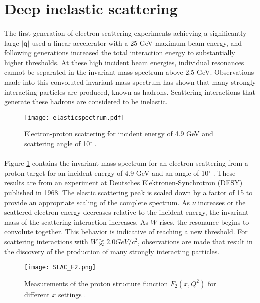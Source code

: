  
\section{Deep inelastic scattering}\label{sec:DIS}
\paragraph{}The first generation of electron scattering experiments achieving a significantly large  $|\boldsymbol{q}|$ used a linear accelerator with a 25 GeV maximum beam energy, and following generations increased the total interaction energy to substantially higher thresholds. At these high incident beam energies, individual resonances cannot be separated in the invariant mass spectrum above 2.5 GeV. Observations made into this convoluted invariant mass spectrum has shown that many strongly interacting particles are produced, known as hadrons. Scattering interactions that generate these hadrons are considered to be inelastic.
\begin{figure}[]
	\centering
	\textbf{ }\par\medskip
	\texttt{[image: elasticspectrum.pdf]}
	\caption{Electron-proton scattering for incident energy of 4.9 GeV and scattering angle of 10$^\circ$ \cite{deltaIsobar}.}
	\label{wspect}
\end{figure}
\paragraph{} Figure \ref{wspect} contains the invariant mass spectrum for an electron scattering from a proton target for an incident energy of 4.9 GeV and an angle of 10$^\circ$ \cite{deltaIsobar}. These results are from an experiment at Deutsches Elektronen-Synchrotron (DESY) published in 1968. The elastic scattering peak is scaled down by a factor of 15 to provide an appropriate scaling of the complete spectrum. As $\nu$ increases or the scattered electron energy decreases relative to the incident energy, the invariant mass of the scattering interaction increases. As $W$ rises, the resonance begins to convolute together. This behavior is indicative of reaching a new threshold. For scattering interactions with $W \gtrapprox 2.0 GeV/c^2$, observations are made that result in the discovery of the production of many strongly interacting particles. 
\begin{figure}[]
	\centering
	\texttt{[image: SLAC\_F2.png]} 
	\caption{ Measurements of the proton structure function $F_2(x, Q^2)$ for different $x$ settings\cite{ref:rev_pp} .}
	\label{F2_fig}
\end{figure} 
